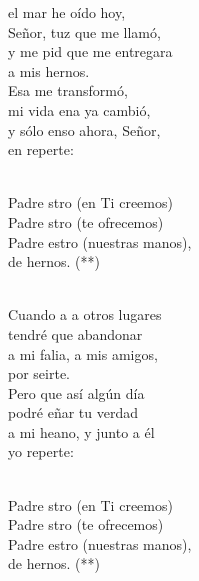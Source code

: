 \documentclass[12pt]{article}
\begin{document}
\begin{multicols*}{2}
\begin{cancion}%
	el mar he oído hoy,\\
	Señor, tuz que me llamó,\\
	y me pid que me entregara \\
	a mis hernos.\\
	Esa  me transformó,\\
	mi vida ena ya cambió,\\
	y sólo enso ahora, Señor,\\
	en reperte:\\\jump\\
	\begin{chorus}%
	Padre stro (en Ti creemos)\\
	Padre stro (te ofrecemos)\\
	Padre estro (nuestras manos),\\
	de hernos. (**)\\
	\end{chorus}%
	\jump\\
	Cuando a a otros lugares\\
	tendré que abandonar\\
	a mi falia, a mis amigos,\\
	por seirte.\\
	Pero  que así algún día\\
	podré eñar tu verdad\\
	a mi heano, y junto a él\\
	yo reperte:\\\jump\\
	\begin{chorus}%
	Padre stro (en Ti creemos)\\
	Padre stro (te ofrecemos)\\
	Padre estro (nuestras manos),\\
	de hernos. (**)\\
	\end{chorus}%
	\jump\\
\end{cancion}%


\end{multicols*}
\end{document}
